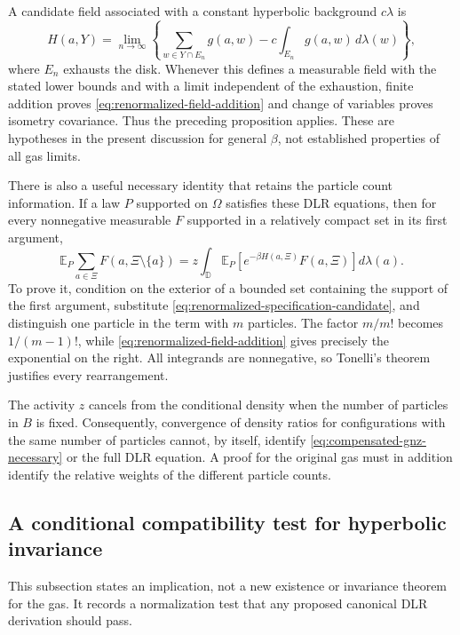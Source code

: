 \documentclass[11pt,a4paper]{article}
\numberwithin{equation}{section}
\theoremstyle{definition}
\theoremstyle{remark}
\newcommand{\E}{\mathbb E}
\begin{document}
A candidate field associated with a constant hyperbolic background
$c\lambda$ is
\begin{equation}
 H(a,Y)=\lim_{n\to\infty}\left\{
   \sum_{w\in Y\cap E_n}g(a,w)
       -c\int_{E_n}g(a,w)\,d\lambda(w)\right\},
 \label{eq:general-centered-green-candidate}
\end{equation}
where $E_n$ exhausts the disk. Whenever this defines a measurable
field with the stated lower bounds and with a limit independent of
the exhaustion, finite addition proves
\eqref{eq:renormalized-field-addition} and change of variables proves
isometry covariance. Thus the preceding proposition applies. These
are hypotheses in the present discussion for general $\beta$, not
established properties of all gas limits.

There is also a useful necessary identity that retains the particle
count information. If a law $P$ supported on $\Omega$ satisfies these DLR equations, then
for every nonnegative measurable $F$ supported in a relatively compact
set in its first argument,
\begin{equation}
 \E_P\sum_{a\in\Xi}F(a,\Xi\setminus\{a\})
 =z\int_{\mathbb D}\E_P\left[
      e^{-\beta H(a,\Xi)}F(a,\Xi)\right]d\lambda(a).
 \label{eq:compensated-gnz-necessary}
\end{equation}
To prove it, condition on the exterior of a bounded set containing
the support of the first argument, substitute
\eqref{eq:renormalized-specification-candidate}, and distinguish one
particle in the term with $m$ particles. The factor $m/m!$ becomes
$1/(m-1)!$, while \eqref{eq:renormalized-field-addition} gives precisely
the exponential on the right. All integrands are nonnegative, so
Tonelli's theorem justifies every rearrangement.

The activity $z$ cancels from the conditional density when the number
of particles in $B$ is fixed. Consequently, convergence of density
ratios for configurations with the same number of particles cannot,
by itself, identify \eqref{eq:compensated-gnz-necessary} or the full
DLR equation. A proof for the original gas must in addition identify
the relative weights of the different particle counts.

\subsection{A conditional compatibility test for hyperbolic invariance}
\label{subsec:conditional-hyperbolic-intensity}

This subsection states an implication, not a new existence or
invariance theorem for the gas. It records a normalization test that
any proposed canonical DLR derivation should pass.
\end{document}
